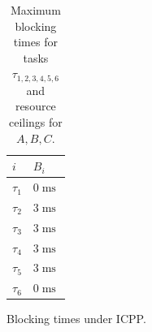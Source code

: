 \documentclass{article}
\numberwithin{equation}{section}
\numberwithin{table}{section}
\numberwithin{figure}{section}
\DeclareMathOperator\mls{ms}
\begin{document}
\begin{enumerate}
\begin{table}
\begin{subtable}{.33\linewidth}
                \begin{tabular}{ll}
                    $i$ & $B_i$ \\
                    \toprule
                    $\tau_1$ & $0\mls$ \\
                    $\tau_2$ & $3\mls$ \\
                    $\tau_3$ & $3\mls$ \\
                    $\tau_4$ & $3\mls$ \\
                    $\tau_5$ & $3\mls$ \\
                    $\tau_6$ & $0\mls$ \\
                    \bottomrule
                \end{tabular}
                \caption{Blocking times under ICPP.}%
                \label{table:icpp-blocking}
            \end{subtable}
            \caption{Maximum blocking times for tasks $\tau_{1,2,3,4,5,6}$ and
                resource ceilings for $A,B,C$.}
        \end{table}


\end{enumerate}
\end{document}

